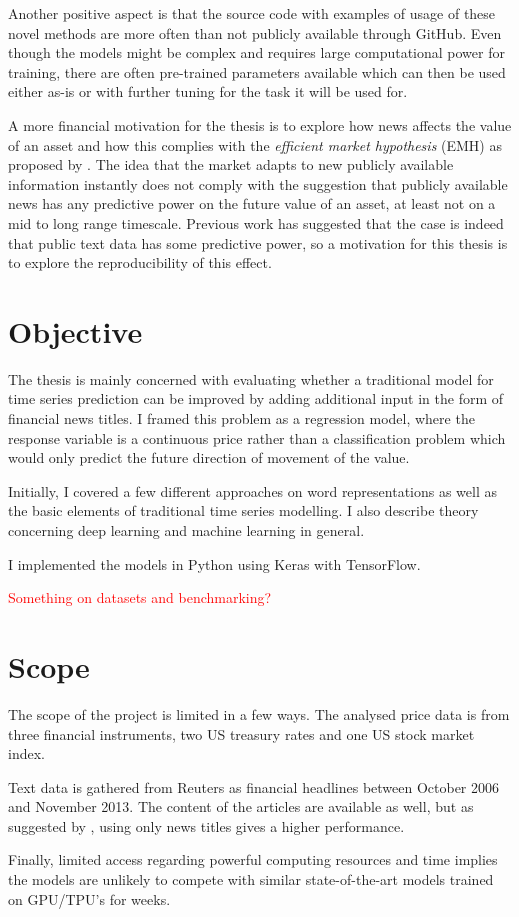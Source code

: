 Another positive aspect is that the source code with examples of usage of these novel methods are more often than not publicly available through GitHub. Even though the models might be complex and requires large computational power for training, there are often pre-trained parameters available which can then be used either as-is or with further tuning for the task it will be used for. 

A more financial motivation for the thesis is to explore how news affects the value of an asset and how this complies with the \textit{efficient market hypothesis} (EMH) as proposed by \citet{malkiel1970efficient}. The idea that the market adapts to new publicly available information instantly does not comply with the suggestion that publicly available news has any predictive power on the future value of an asset, at least not on a mid to long range timescale. Previous work has suggested that the case is indeed that public text data has some predictive power, so a motivation for this thesis is to explore the reproducibility of this effect.

\section{Objective}

The thesis is mainly concerned with evaluating whether a traditional model for time series prediction can be improved by adding additional input in the form of financial news titles. I framed this problem as a regression model, where the response variable is a continuous price rather than a classification problem which would only predict the future direction of movement of the value. 

Initially, I covered a few different approaches on word representations as well as the basic elements of traditional time series modelling. I also describe theory concerning deep learning and machine learning in general. 

I implemented the models in Python using Keras with TensorFlow. 

\textcolor{red}{Something on datasets and benchmarking?}

\section{Scope}

The scope of the project is limited in a few ways. The analysed price data is from three financial instruments, two US treasury rates and one US stock market index. 

Text data is gathered from Reuters as financial headlines between October 2006 and November 2013. The content of the articles are available as well, but as suggested by \citet{ding2014using}, using only news titles gives a higher performance. 

Finally, limited access regarding powerful computing resources and time implies the models are unlikely to compete with similar state-of-the-art models trained on GPU/TPU's for weeks. 










